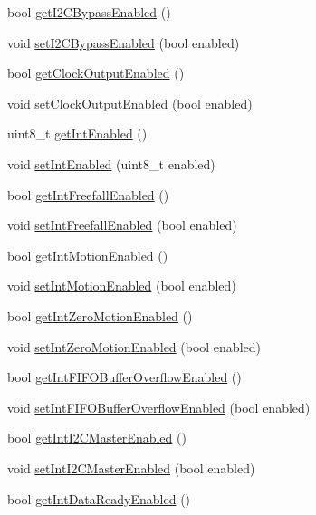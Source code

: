 \begin{DoxyCompactItemize}
\item 
bool \hyperlink{classMPU6050_aed33db318a770d0020eb8b84058650f3}{get\+I2\+C\+Bypass\+Enabled} ()
\item 
void \hyperlink{classMPU6050_aa828160756a50f414aa3f5f5f0353c70}{set\+I2\+C\+Bypass\+Enabled} (bool enabled)
\item 
bool \hyperlink{classMPU6050_ada96c33957bf20c04ca598a3537358ef}{get\+Clock\+Output\+Enabled} ()
\item 
void \hyperlink{classMPU6050_a71ec4642b6f6c937bbf6a24fea4179e5}{set\+Clock\+Output\+Enabled} (bool enabled)
\item 
uint8\+\_\+t \hyperlink{classMPU6050_a295c9600579557df065aff88bc7a1d83}{get\+Int\+Enabled} ()
\item 
void \hyperlink{classMPU6050_ac7bcf24249dd5000320a8ec0ffe488c6}{set\+Int\+Enabled} (uint8\+\_\+t enabled)
\item 
bool \hyperlink{classMPU6050_a500bb2df2e46eaecd3fb2ba7304a5ed3}{get\+Int\+Freefall\+Enabled} ()
\item 
void \hyperlink{classMPU6050_a01a24a05f06463d5277e1670d6260e03}{set\+Int\+Freefall\+Enabled} (bool enabled)
\item 
bool \hyperlink{classMPU6050_a7de31a8e9f22765329d9f9e02db2f1f0}{get\+Int\+Motion\+Enabled} ()
\item 
void \hyperlink{classMPU6050_a2d2d1d3b03198a09c83a48ec3bc20bd8}{set\+Int\+Motion\+Enabled} (bool enabled)
\item 
bool \hyperlink{classMPU6050_ab3cc9bcaca6cec61e7f3f0c6c8a37db5}{get\+Int\+Zero\+Motion\+Enabled} ()
\item 
void \hyperlink{classMPU6050_a5e36e3acace6e545718d7997169cff9b}{set\+Int\+Zero\+Motion\+Enabled} (bool enabled)
\item 
bool \hyperlink{classMPU6050_a55f99c88cc84901f245924ed5e3fe47e}{get\+Int\+F\+I\+F\+O\+Buffer\+Overflow\+Enabled} ()
\item 
void \hyperlink{classMPU6050_a83710a6b1e07f3b385239cc06f275cdb}{set\+Int\+F\+I\+F\+O\+Buffer\+Overflow\+Enabled} (bool enabled)
\item 
bool \hyperlink{classMPU6050_a282ae29e029d88604a59c92bdf9ce252}{get\+Int\+I2\+C\+Master\+Enabled} ()
\item 
void \hyperlink{classMPU6050_af238656844a3727fa96a8d434b55473e}{set\+Int\+I2\+C\+Master\+Enabled} (bool enabled)
\item 
bool \hyperlink{classMPU6050_ae15f6043a74c9c9bf9754824802ce8d3}{get\+Int\+Data\+Ready\+Enabled} ()
\item 

\end{DoxyCompactItemize}
